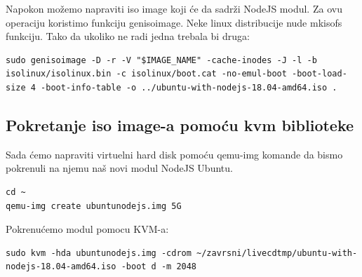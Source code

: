 \documentclass[12pt,vi]{mitthesis}
\begin{document}
\noindent
Napokon možemo napraviti iso image koji će da sadrži NodeJS modul. Za ovu operaciju koristimo funkciju genisoimage. Neke linux distribucije nude mkisofs funkciju. Tako da ukoliko ne radi jedna trebala bi druga:
\begin{lstlisting}[style=BashInputStyle]
sudo genisoimage -D -r -V "$IMAGE_NAME" -cache-inodes -J -l -b isolinux/isolinux.bin -c isolinux/boot.cat -no-emul-boot -boot-load-size 4 -boot-info-table -o ../ubuntu-with-nodejs-18.04-amd64.iso .
\end{lstlisting}

\subsection*{Pokretanje iso image-a pomoću kvm biblioteke}
\indent
Sada ćemo napraviti virtuelni hard disk pomoću qemu-img komande da bismo pokrenuli na njemu naš novi modul NodeJS Ubuntu.
\begin{lstlisting}[style=BashInputStyle]
cd ~
qemu-img create ubuntunodejs.img 5G
\end{lstlisting}

\noindent 
Pokrenućemo modul pomocu KVM-a:
\begin{lstlisting}[style=BashInputStyle]
sudo kvm -hda ubuntunodejs.img -cdrom ~/zavrsni/livecdtmp/ubuntu-with-nodejs-18.04-amd64.iso -boot d -m 2048
\end{lstlisting}
\end{document}
